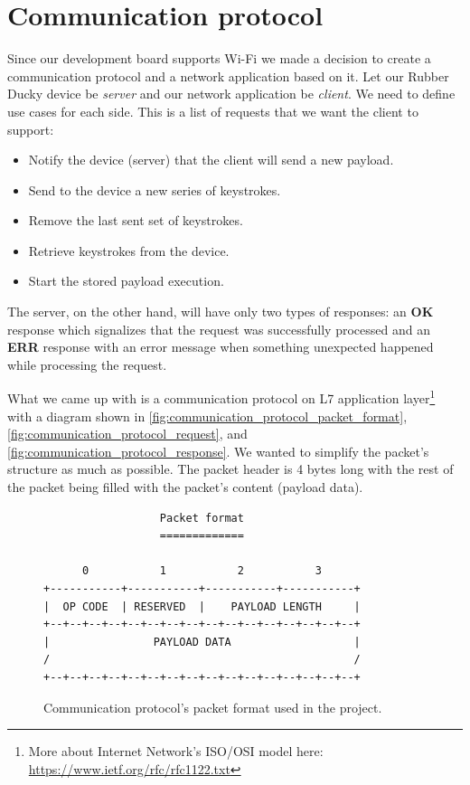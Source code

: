 \section{Communication protocol}
\label{sec:design_communication_protocol}
Since our development board supports Wi-Fi we made a decision to create a communication protocol and a network application based on it. Let our Rubber Ducky device be \emph{server} and our network application be \emph{client}. We need to define use cases for each side. This is a list of requests that we want the client to support:
\begin{itemize}
    \item Notify the device (server) that the client will send a new payload.
    \item Send to the device a new series of keystrokes.
    \item Remove the last sent set of keystrokes.
    \item Retrieve keystrokes from the device.
    \item Start the stored payload execution.
\end{itemize}

The server, on the other hand, will have only two types of responses: an \textbf{OK} response which signalizes that the request was successfully processed and an \textbf{ERR} response with an error message when something unexpected happened while processing the request.

What we came up with is a communication protocol on L7 application layer\footnote{More about Internet Network's ISO/OSI model here: \url{https://www.ietf.org/rfc/rfc1122.txt}} with a diagram shown in \autoref{fig:communication_protocol_packet_format}, \autoref{fig:communication_protocol_request}, and \autoref{fig:communication_protocol_response}. We wanted to simplify the packet's structure as much as possible. The packet header is 4 bytes long with the rest of the packet being filled with the packet's content (payload data).

\begin{figure}[ht]
\centering
\begin{varwidth}{\linewidth}
\begin{verbatim}
                  Packet format
                  =============

      0           1           2           3
+-----------+-----------+-----------+-----------+
|  OP CODE  | RESERVED  |    PAYLOAD LENGTH     |
+--+--+--+--+--+--+--+--+--+--+--+--+--+--+--+--+
|                PAYLOAD DATA                   |
/                                               /
+--+--+--+--+--+--+--+--+--+--+--+--+--+--+--+--+
\end{verbatim}
\end{varwidth}
\caption{Communication protocol's packet format used in the project.}
\label{fig:communication_protocol_packet_format}
\end{figure}

